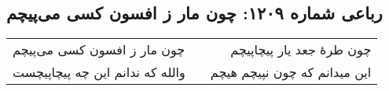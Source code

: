 \begin{center}
\section*{رباعی شماره ۱۲۰۹: چون مار ز افسون کسی می‌پیچم}
\label{sec:1209}
\begin{longtable}{l p{0.5cm} r}
چون مار ز افسون کسی می‌پیچم
&&
چون طرهٔ جعد یار پیچاپیچم
\\
والله که ندانم این چه پیچاپیچست
&&
این میدانم که چون نپیچم هیچم
\\
\end{longtable}
\end{center}
